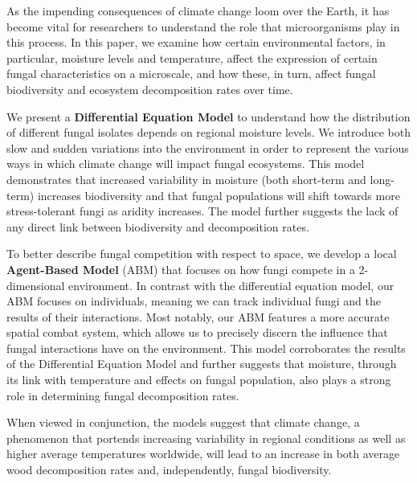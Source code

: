 \documentclass[12pt]{article}
\begin{document}
\begin{adjustwidth}{50pt}{50pt}

\vspace{3em}
As the impending consequences of climate change loom over the Earth, it has become vital for researchers to understand the role that microorganisms play in this process. In this paper, we examine how certain environmental factors, in particular, moisture levels and temperature, affect the expression of certain fungal characteristics on a microscale, and how these, in turn, affect fungal biodiversity and ecosystem decomposition rates over time. 

We present a \textbf{Differential Equation Model} to understand how the distribution of different fungal isolates depends on regional moisture levels. We introduce both slow and sudden variations into the environment in order to represent the various ways in which climate change will impact fungal ecosystems. This model demonstrates that increased variability in moisture (both short-term and long-term) increases biodiversity and that fungal populations will shift towards more stress-tolerant fungi as aridity increases. The model further suggests the lack of any direct link between biodiversity and decomposition rates.

To better describe fungal competition with respect to space, we develop a local \textbf{Agent-Based Model} (ABM) that focuses on how fungi compete in a 2-dimensional environment. In contrast with the differential equation model, our ABM focuses on individuals, meaning we can track individual fungi and the results of their interactions.  Most notably, our ABM features a more accurate spatial combat system, which allows us to precisely discern the influence that fungal interactions have on the environment. This model corroborates the results of the Differential Equation Model and further suggests that moisture, through its link with temperature and effects on fungal population, also plays a strong role in determining fungal decomposition rates.

When viewed in conjunction, the models suggest that climate change, a phenomenon that portends increasing variability in regional conditions as well as higher average temperatures worldwide, will lead to an increase in both average wood decomposition rates and, independently, fungal biodiversity.

\end{adjustwidth}

\end{document}
